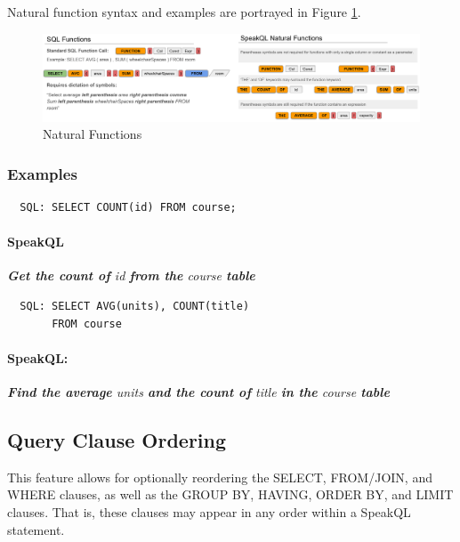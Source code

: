 Natural function syntax and examples are portrayed in Figure \ref{fig:naturalfunctions}.

\begin{figure}
    \centering
    \includegraphics[width=\textwidth]{figures/natural_functions.png}
    \caption{Natural Functions}
    \label{fig:naturalfunctions}
\end{figure}

\subsubsection{\textbf{Examples}}

\begin{verbatim}
  SQL: SELECT COUNT(id) FROM course;
\end{verbatim}
\paragraph{SpeakQL} \emph{\textbf{Get the count of} id \textbf{from the} course  \textbf{table}}

\vspace{2mm}
\begin{verbatim}
  SQL: SELECT AVG(units), COUNT(title)
       FROM course
\end{verbatim}
\paragraph{SpeakQL:} \emph{\textbf{Find the average} units \textbf{and the count of} title \textbf{in the} course \textbf{table}}



\subsection{Query Clause Ordering}

This feature allows for optionally reordering the SELECT, FROM/JOIN, and WHERE clauses, as well as the GROUP BY, HAVING, ORDER BY, and LIMIT clauses. 
That is, these clauses may appear in any order within a SpeakQL statement. 


